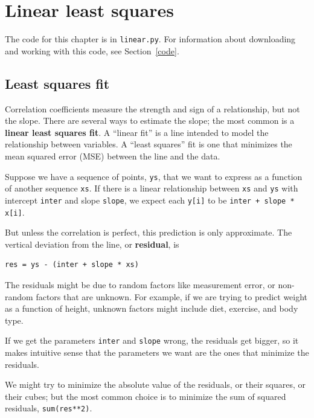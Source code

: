 \documentclass[12pt]{book}
\begin{document}
\chapter{Linear least squares}
\label{linear}

The code for this chapter is in \verb"linear.py".  For information
about downloading and working with this code, see Section~\ref{code}.


\section{Least squares fit}

Correlation coefficients measure the strength and sign of a
relationship, but not the slope.  There are several ways to estimate
the slope; the most common is a {\bf linear least squares fit}.  A
``linear fit'' is a line intended to model the relationship between
variables.  A ``least squares'' fit is one that minimizes the mean
squared error (MSE) between the line and the data.

Suppose we have a sequence of points, \verb"ys", that we want to
express as a function of another sequence \verb"xs".  If there is a
linear relationship between \verb"xs" and \verb"ys" with intercept \verb"inter"
and slope \verb"slope", we expect each \verb"y[i]" to be
\verb"inter + slope * x[i]".  

But unless the correlation is perfect, this prediction is only
approximate.  The vertical deviation from the line, or {\bf residual},
is

\begin{verbatim}
res = ys - (inter + slope * xs)
\end{verbatim}

The residuals might be due to random factors like measurement error,
or non-random factors that are unknown.  For example, if we are
trying to predict weight as a function of height, unknown factors
might include diet, exercise, and body type.

If we get the parameters \verb"inter" and \verb"slope" wrong, the residuals
get bigger, so it makes intuitive sense that the parameters we want
are the ones that minimize the residuals.

We might try to minimize the absolute value of the
residuals, or their squares, or their cubes; but the most common
choice is to minimize the sum of squared residuals,
\verb"sum(res**2)".
\end{document}
